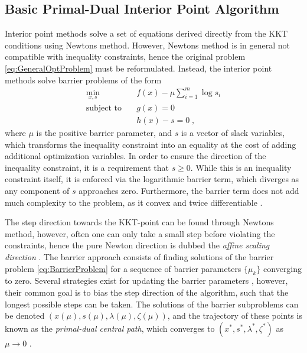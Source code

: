 \subsection{Basic Primal-Dual Interior Point Algorithm}
Interior point methods solve a set of equations derived directly from the KKT conditions using Newtons method. However, Newtons method is in general not compatible with inequality constraints, hence the original problem \eqref{eq:GeneralOptProblem} must be reformulated. Instead, the interior point methods solve barrier problems of the form 
\begin{subequations}	
 \begin{align}
	\min_{x,s} 			\quad & f(x) - \mu \sum_{i = 1}^{m} \log s_i \\
	\text{subject to} 	\quad & g(x) = 0  		\\ 
						   	  & h(x) - s  = 0 	\; ,
\end{align}
\label{eq:BarrierProblem}
\end{subequations}
where $\mu$ is the positive barrier parameter, and $s$ is a vector of slack variables, which transforms the inequality constraint into an equality at the cost of adding additional optimization variables. In order to ensure the direction of the inequality constraint, it is a requirement that $s \geq 0$. While this is an inequality constraint itself, it is enforced via the logarithmic barrier term, which diverges as any component of $s$ approaches zero. Furthermore, the barrier term does not add much complexity to the problem, as it convex and twice differentiable \cite{Wachter2006}.

The step direction towards the KKT-point can be found through Newtons method, however, often one can only take a small step before violating the constraints, hence the pure Newton direction is dubbed the \textit{affine scaling direction} \cite{wright}. The barrier approach consists of finding solutions of the barrier problem \eqref{eq:BarrierProblem} for a sequence of barrier parameters $\{ \mu_k \}$ converging to zero. Several strategies exist for updating the barrier parameters \cite{Byrd1997,Fiacco1990}, however, their common goal is to bias the step direction of the algorithm, such that the longest possible steps can be taken. The solutions of the barrier subproblems can be denoted $(x(\mu),s(\mu), \lambda(\mu),\zeta(\mu))$, and the trajectory of these points is known as the \textit{primal-dual central path}, which converges to $(x^*,s^*, \lambda^*,\zeta^*)$ as $\mu \to 0$ \cite{wright}.\\

